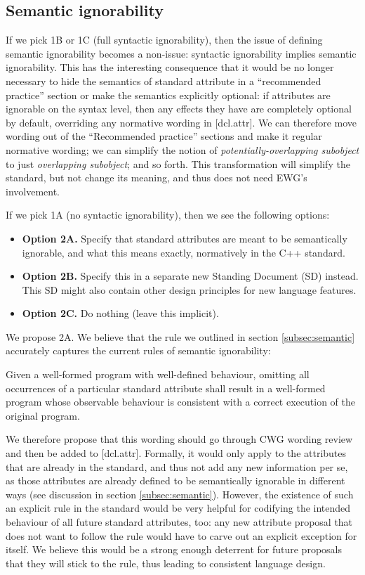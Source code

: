 \subsection{Semantic ignorability}

If we pick 1B or 1C (full syntactic ignorability), then the issue of defining semantic ignorability becomes a non-issue: syntactic ignorability implies semantic ignorability. This has the interesting consequence that it would be no longer necessary to hide the semantics of standard attribute in a ``recommended practice'' section or make the semantics explicitly optional: if attributes are ignorable on the syntax level, then any effects they have are completely optional by default, overriding any normative wording in [dcl.attr]. We can therefore move wording out of the ``Recommended practice'' sections and make it regular normative wording; we can simplify the notion of \emph{potentially-overlapping subobject} to just \emph{overlapping subobject}; and so forth. This transformation will simplify the standard, but not change its meaning, and thus does not need EWG's involvement.

If we pick 1A (no syntactic ignorability), then we see the following options:

\begin{itemize}
\item \textbf{Option 2A.} Specify that standard attributes are meant to be semantically ignorable, and what this means exactly, normatively in the C++ standard.
\item \textbf{Option 2B.} Specify this in a separate new Standing Document (SD) instead. This SD might also contain other design principles for new language features.
\item \textbf{Option 2C.} Do nothing (leave this implicit).
\end{itemize}

We propose 2A. We believe that the rule we outlined in section \ref{subsec:semantic} accurately captures the current rules of semantic ignorability:
\begin{adjustwidth}{0.5cm}{0.5cm}
Given a well-formed program with well-defined behaviour, omitting all occurrences of a particular standard attribute shall result in a well-formed program whose observable behaviour is consistent with a correct execution of the original program.
\end{adjustwidth}
We therefore propose that this wording should go through CWG wording review and then be added to [dcl.attr]. Formally, it would only apply to the attributes that are already in the standard, and thus not add any new information per se, as those attributes are already defined to be semantically ignorable in different ways (see discussion in section \ref{subsec:semantic}). However, the existence of such an explicit rule in the standard would be very helpful for codifying the intended behaviour of all future standard attributes, too: any new attribute proposal that does not want to follow the rule would have to carve out an explicit exception for itself. We believe this would be a strong enough deterrent for future proposals that they will stick to the rule, thus leading to consistent language design.

